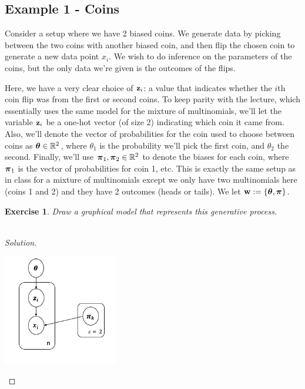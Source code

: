 \documentclass[12pt,letterpaper]{article}
\newcommand{\BR}{\mathbb R}
\newtheorem{exercise}{Exercise}
\newenvironment{exercisesolution}
  {\begin{proof}[Solution]}
  {\end{proof}}
\begin{document}
\subsection{Example 1 - Coins}

Consider a setup where we have 2 biased coins. We generate data by picking between the two coins with another biased coin, and then flip the chosen coin to generate a new data point $x_i$. We wish to do inference on the parameters of the coins, but the only data we're given is the outcomes of the flips.

Here, we have a very clear choice of $\mathbf{z}_i$: a value that indicates whether the $i$th coin flip was from the first or second coins. To keep parity with the lecture, which essentially uses the same model for the mixture of multinomials, we'll let the variable $\mathbf{z}_i$ be a one-hot vector (of size 2) indicating which coin it came from. Also, we'll denote the vector of probabilities for the coin used to choose between coins as $\btheta \in \BR^2$, where $\theta_1$ is the probability we'll pick the first coin, and $\theta_2$ the second. Finally, we'll use $\bpi_1, \bpi_2 \in \BR^{2}$  to denote the biases for each coin, where $\boldsymbol{\pi}_1$ is the vector of probabilities for coin 1, etc. This is exactly the same setup as in class for a mixture of multinomials except we only have two multinomials here (coins 1 and 2) and they have 2 outcomes (heads or tails). We let $\mathbf{w} := \{\boldsymbol{\theta}, \boldsymbol{\pi}\}$.



\begin{exercise}
Draw a graphical model that represents this generative process.\\\\
\end{exercise}

\begin{exercisesolution}
\begin{center}
\includegraphics[width=5cm]{coins_plate}
\end{center}
\end{exercisesolution}
\end{document}
